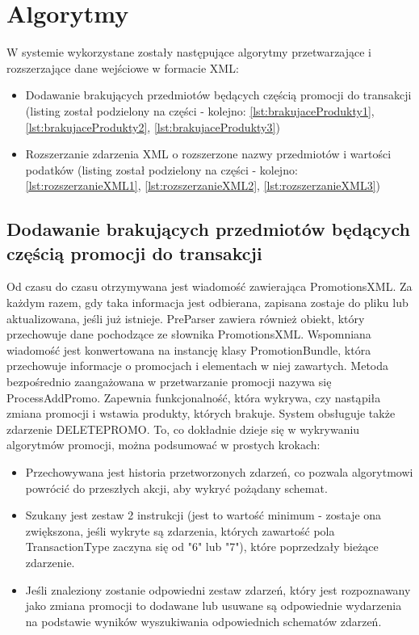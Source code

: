\documentclass[a4paper]{book}
\begin{document}
\section{Algorytmy}
W systemie wykorzystane zostały następujące algorytmy przetwarzające i rozszerzające dane wejściowe w formacie XML:
\begin{itemize}
	\item Dodawanie brakujących przedmiotów będących częścią promocji do transakcji (listing został podzielony na części - kolejno: \ref{lst:brakujaceProdukty1}, \ref{lst:brakujaceProdukty2}, \ref{lst:brakujaceProdukty3})
	\item Rozszerzanie zdarzenia XML o rozszerzone nazwy przedmiotów i wartości podatków (listing został podzielony na części - kolejno: \ref{lst:rozszerzanieXML1}, \ref{lst:rozszerzanieXML2}, \ref{lst:rozszerzanieXML3})
\end{itemize}
\subsection{Dodawanie brakujących przedmiotów będących częścią promocji do transakcji}
Od czasu do czasu otrzymywana jest wiadomość zawierająca PromotionsXML. Za każdym razem, gdy taka informacja jest odbierana, zapisana zostaje do pliku lub aktualizowana, jeśli już istnieje. PreParser zawiera również obiekt, który przechowuje dane pochodzące ze słownika PromotionsXML. Wspomniana wiadomość jest konwertowana na instancję klasy PromotionBundle, która przechowuje informacje o promocjach i elementach w niej zawartych. Metoda bezpośrednio zaangażowana w przetwarzanie promocji nazywa się ProcessAddPromo. Zapewnia funkcjonalność, która wykrywa, czy nastąpiła zmiana promocji i wstawia produkty, których brakuje. System obsługuje także zdarzenie DELETEPROMO. To, co dokładnie dzieje się w wykrywaniu algorytmów promocji, można podsumować w prostych krokach:
\begin{itemize}
	\item Przechowywana jest historia przetworzonych zdarzeń, co pozwala algorytmowi powrócić do przeszłych akcji, aby wykryć pożądany schemat.
	\item Szukany jest zestaw 2 instrukcji (jest to wartość minimum - zostaje ona zwiększona, jeśli wykryte są zdarzenia, których zawartość pola TransactionType zaczyna się od "6" lub "7"), które poprzedzały bieżące zdarzenie.
	\item Jeśli znaleziony zostanie odpowiedni zestaw zdarzeń, który jest rozpoznawany jako zmiana promocji to dodawane lub usuwane są odpowiednie wydarzenia na podstawie wyników wyszukiwania odpowiednich schematów zdarzeń.
\end{itemize}
\end{document}
